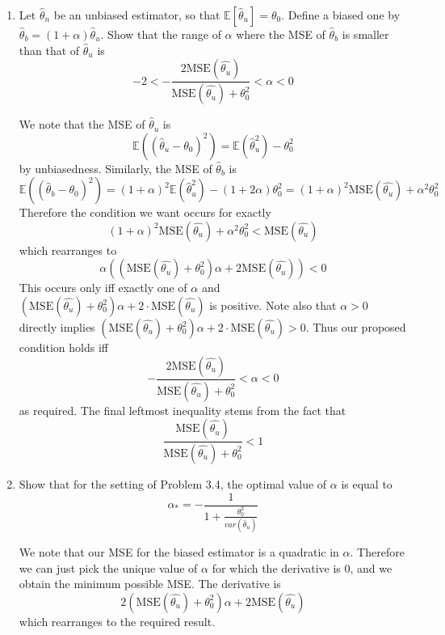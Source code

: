 \documentclass{article}
\newcommand{\chapternumber}{3}
\newenvironment{QandA}{\begin{enumerate}[label=\chapternumber.\arabic*]\bfseries\boldmath}
	{\end{enumerate}}
\newenvironment{answered}{\par\bigskip\normalfont\unboldmath}{}
\begin{document}
\begin{QandA}
		\item Let $\hat{\theta}_n$ be an unbiased estimator, so that $\mathbb{E}[\hat{\theta}_u]=\theta_0$. Define a biased one by $\hat{\theta}_b=(1+\alpha)\hat{\theta}_u$. Show that the range of $\alpha$ where the MSE of $\hat{\theta}_b$ is smaller than that of $\hat{\theta}_u$ is
		\[-2<-\frac{2\text{MSE}(\hat{\theta_u})}{\text{MSE}(\hat{\theta_u})+\theta_0^2}<\alpha<0\]
		\begin{answered}
			We note that the MSE of $\hat{\theta}_u$ is 
			\[\mathbb{E}((\hat{\theta}_u-\theta_0)^2)=\mathbb{E}(\hat{\theta}_u^2)-\theta_0^2\]
			by unbiasedness. Similarly, the MSE of $\hat{\theta}_b$ is
			\[\mathbb{E}((\hat{\theta}_b-\theta_0)^2)=(1+\alpha)^2\mathbb{E}(\hat{\theta}_u^2)-(1+2\alpha)\theta_0^2=(1+\alpha)^2\text{MSE}(\hat{\theta_u})+\alpha^2\theta_0^2\]
			Therefore the condition we want occurs for exactly
			\[(1+\alpha)^2\text{MSE}(\hat{\theta_u})+\alpha^2\theta_0^2<\text{MSE}(\hat{\theta_u})\]
			which rearranges to 
			\[\alpha((\text{MSE}(\hat{\theta_u})+\theta_0^2)\alpha+2\text{MSE}(\hat{\theta_u}))<0\]
			This occurs only iff exactly one of $\alpha$ and $(\text{MSE}(\hat{\theta_u})+\theta_0^2)\alpha+2\cdot\text{MSE}(\hat{\theta_u})$ is positive. Note also that $\alpha>0$ directly implies $(\text{MSE}(\hat{\theta_u})+\theta_0^2)\alpha+2\cdot\text{MSE}(\hat{\theta_u})>0$. Thus our proposed condition holds iff
			\[-\frac{2\text{MSE}(\hat{\theta_u})}{\text{MSE}(\hat{\theta_u})+\theta_0^2}<\alpha<0\]
			as required. The final leftmost inequality stems from the fact that 
			\[\frac{\text{MSE}(\hat{\theta_u})}{\text{MSE}(\hat{\theta_u})+\theta_0^2}<1\]
			
		\end{answered}
	
		\item Show that for the setting of Problem 3.4, the optimal value of $\alpha$ is equal to 
		\[\alpha_*=-\frac{1}{1+\frac{\theta_0^2}{var(\hat{\theta}_u)}}\]
		\begin{answered}
			We note that our MSE for the biased estimator is a quadratic in $\alpha$. Therefore we can just pick the unique value of $\alpha$ for which the derivative is 0, and we obtain the minimum possible MSE. The derivative is
			\[2(\text{MSE}(\hat{\theta_u})+\theta_0^2)\alpha+2\text{MSE}(\hat{\theta_u})\]
			which rearranges to the required result.
		\end{answered}
	

\end{QandA}
\end{document}
